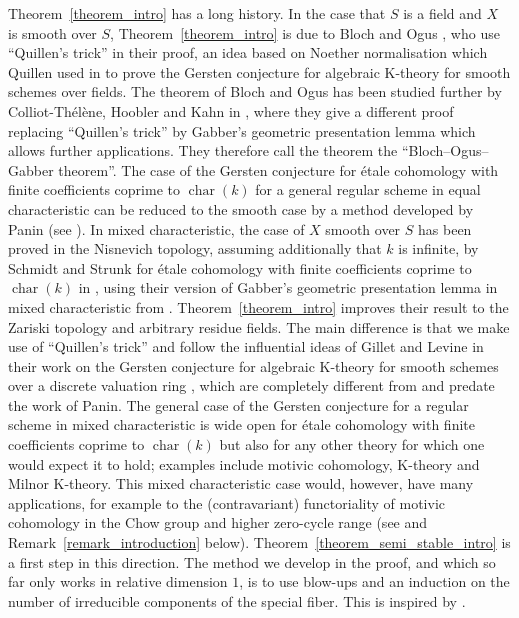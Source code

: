 \documentclass[10pt,a4paper]{article}
\numberwithin{equation}{section}
\newtheorem{Key lemma}[theorem]{Key lemma}
\theoremstyle{definition}
\theoremstyle{remark}
\DeclareMathOperator{\Char}{char}
\begin{document}
Theorem~\ref{theorem_intro} has a long history.
In the case that $S$ is a field and $X$ is smooth over $S$, Theorem~\ref{theorem_intro} is due to Bloch and Ogus \cite{BO74}, who use ``Quillen's trick'' in their proof, an idea based on Noether normalisation which Quillen used in \cite{Qu72} to prove the Gersten conjecture for algebraic K-theory for smooth schemes over fields. The theorem of Bloch and Ogus has been studied further by Colliot-Th\'el\`ene, Hoobler and Kahn in \cite{CHK97}, where they give a different proof replacing ``Quillen's trick'' by Gabber's geometric presentation lemma which allows further applications. They therefore call the theorem the ``Bloch--Ogus--Gabber theorem''. The case of the Gersten conjecture for \'etale cohomology with finite coefficients coprime to $\Char(k)$ for a general regular scheme in equal characteristic can be reduced to the smooth case by a method developed by Panin (see \cite[Section~5]{Pa03}). In mixed characteristic, the case of $X$ smooth over $S$ has been proved in the Nisnevich topology, assuming additionally that $k$ is infinite, by Schmidt and Strunk for \'etale cohomology with finite coefficients coprime to $\Char(k)$ in \cite{SS19}, using their version of Gabber's geometric presentation lemma in mixed characteristic from \cite{SS18}. Theorem~\ref{theorem_intro} improves their result to the Zariski topology and arbitrary residue fields. The main difference is that we make use of ``Quillen's trick'' and follow the influential ideas of Gillet and Levine in their work on the Gersten conjecture for algebraic K-theory for smooth schemes over a discrete valuation ring \cite{GL87}, which are completely different from and predate the work of Panin. The general case of the Gersten conjecture for a regular scheme in mixed characteristic is wide open for \'etale cohomology with finite coefficients coprime to $\Char(k)$ but also for any other theory for which one would expect it to hold; examples include motivic cohomology, K-theory and Milnor K-theory. This mixed characteristic case would, however, have many applications, for example to the (contravariant) functoriality of motivic cohomology in the Chow group and higher zero-cycle range (see \cite{KEW16} and Remark~\ref{remark_introduction} below). Theorem~\ref{theorem_semi_stable_intro} is a first step in this direction. The method we develop in the proof, and which so far only works in relative dimension $1$, is to use blow-ups and an induction on the number of irreducible components of the special fiber. This is inspired by \cite[Section~3]{Hyodo1988}. 
\end{document}
